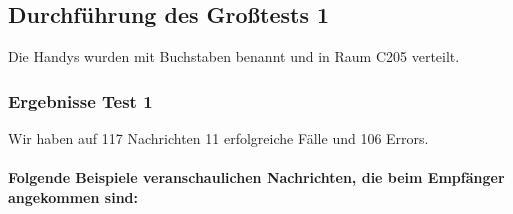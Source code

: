 \subsection{Durchführung des Großtests 1}

Die Handys wurden mit Buchstaben benannt und in Raum C205 verteilt.


\subsubsection{Ergebnisse Test 1}

Wir haben auf 117 Nachrichten 11 erfolgreiche Fälle und 106 Errors.

\paragraph{Folgende Beispiele veranschaulichen Nachrichten, die beim Empfänger angekommen sind:}

